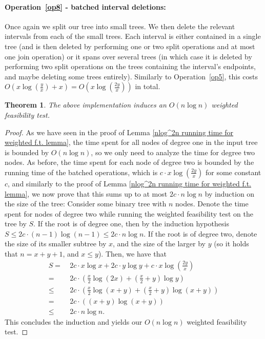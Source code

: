 \documentclass[11pt,a4paper]{article}
\newtheorem{theorem}{Theorem}[section]
\theoremstyle{definition}
\theoremstyle{remark}
\begin{document}
\paragraph{Operation~\ref{op8} - batched interval deletions:}
Once again we split our tree into small trees. We then delete the relevant intervals from each of the small trees. Each interval is either contained in a single tree (and is then deleted by performing one or two split operations and at most one join operation) or it spans over several trees (in which case it is deleted by performing two split operations on the trees containing the interval's  endpoints, and maybe deleting some trees entirely). Similarly to Operation~\ref{op5}, this costs $O(x \log(\frac{y}{x}) +x) = O(x \log(\frac{2y}{x}))$ in total.
\begin{theorem}
The above implementation induces an $O(n \log n)$ weighted feasibility test.
\end{theorem}
\begin{proof}
As we have seen in the proof of Lemma \ref{nlog^2n running time for weighted f.t. lemma}, the time spent for all nodes of degree one in the input tree is bounded by $O(n \log n)$, so we only need to analyze the time for degree two nodes.
%
As before, the time spent for each node of degree two is bounded by the running time of the batched operations, which is $c\cdot x \log (\frac{2y}{x})$ for some constant $c$, and similarly to the proof of Lemma \ref{nlog^2n running time for weighted f.t. lemma}, we now prove that this sums up to at most $2c \cdot n \log n$ by induction on the size of the  tree: Consider some binary tree with $n$ nodes. Denote the time spent for nodes of degree two while running the weighted feasibility test on the tree by $S$. If the root is of degree one, then by the induction hypothesis $S \leq 2c\cdot (n-1)\log(n-1)\leq 2c\cdot n \log n$. If the root is of degree two, denote the size of its smaller subtree by $x$, and the size of the larger by $y$ (so it holds that $n=x+y+1$, and $x \leq y$). Then, we have that
\begin{align*}
S = & \ 2c\cdot x \log x + 2c\cdot y \log y + c\cdot x \log (\frac{2y}{x})\\
= & \ 2c\cdot (\frac{x}{2}\log(2x)+(\frac{x}{2}+y)\log y) \\
\leq & \ 2c\cdot (\frac{x}{2}\log(x+y)+(\frac{x}{2}+y)\log (x+y)) \\
= & \ 2c\cdot ((x+y)\log(x+y)) \\
\leq & \ 2c\cdot n \log n.
\end{align*}
This concludes the induction and yields our $O(n \log n)$ weighted feasibility test.
\end{proof}



\end{document}
